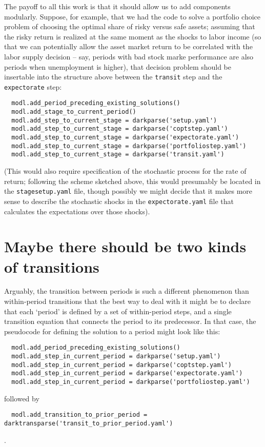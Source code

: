 \documentclass[SolvingMicroDSOPs]{subfiles}
\begin{document}
The payoff to all this work is that it should allow us to add components modularly.  Suppose, for example, that we had the code to solve a portfolio choice problem of choosing the optimal share of risky versus safe assets; assuming that the risky return is realized at the same moment as the shocks to labor income (so that we can potentially allow the asset market return to be correlated with the labor supply decision -- say, periods with bad stock marke performance are also periods when unemployment is higher), that decision problem should be insertable into the structure above between the \texttt{transit} step and the \texttt{expectorate} step:
\begin{verbatim}
  modl.add_period_preceding_existing_solutions()
  modl.add_stage_to_current_period()
  modl.add_step_to_current_stage = darkparse('setup.yaml')
  modl.add_step_to_current_stage = darkparse('coptstep.yaml')
  modl.add_step_to_current_stage = darkparse('expectorate.yaml')
  modl.add_step_to_current_stage = darkparse('portfoliostep.yaml')
  modl.add_step_to_current_stage = darkparse('transit.yaml')
\end{verbatim}

(This would also require specification of the stochastic process for the rate of return; following the scheme sketched above, this would presumably be located in the \texttt{stagesetup.yaml} file, though possibly we might decide that it makes more sense to describe the stochastic shocks in the \texttt{expectorate.yaml} file that calculates the expectations over those shocks).

\section{Maybe there should be two kinds of transitions}

Arguably, the transition between periods is such a different phenomenon than within-period transitions that the best way to deal with it might be to declare that each `period' is defined by a set of within-period steps, and a single transition equation that connects the period to its predecessor.  In that case, the pseudocode for defining the solution to a period might look like this:

\begin{verbatim}
  modl.add_period_preceding_existing_solutions()
  modl.add_step_in_current_period = darkparse('setup.yaml')
  modl.add_step_in_current_period = darkparse('coptstep.yaml')
  modl.add_step_in_current_period = darkparse('expectorate.yaml')
  modl.add_step_in_current_period = darkparse('portfoliostep.yaml')
\end{verbatim}
followed by
\begin{verbatim}
  modl.add_transition_to_prior_period = darktransparse('transit_to_prior_period.yaml')
\end{verbatim}
.

\onlyinsubfile{}
\end{document}
